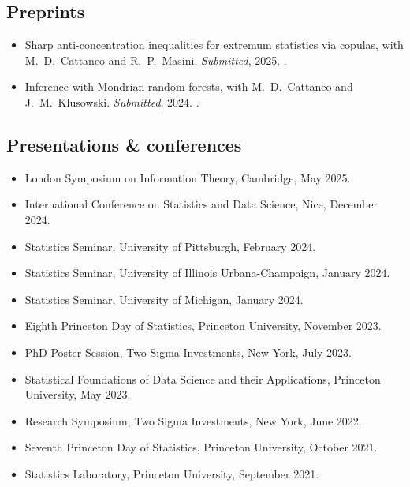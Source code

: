 \documentclass{wgu-cv}
\begin{document}
\subsection{Preprints}{}
\begin{itemize}

  \item Sharp anti-concentration inequalities
    for extremum statistics via copulas,
    with M.\ D.\ Cattaneo and R.\ P.\ Masini.
    \emph{Submitted}, 2025.
    .

  \item Inference with Mondrian random forests,
    with M.\ D.\ Cattaneo and J.\ M.\ Klusowski.
    \emph{Submitted}, 2024.
    .

\end{itemize}




\subsection{Presentations \& conferences}{}
\begin{itemize}
  \item London Symposium on Information Theory, Cambridge,
    May 2025.
  \item International Conference on Statistics and Data Science, Nice,
    December 2024.
  \item Statistics Seminar, University of Pittsburgh,
    February 2024.
  \item Statistics Seminar, University of Illinois Urbana-Champaign,
    January 2024.
  \item Statistics Seminar, University of Michigan,
    January 2024.
  \item Eighth Princeton Day of Statistics, Princeton University,
    November 2023.
  \item PhD Poster Session, Two Sigma Investments, New York,
    July 2023.
  \item Statistical Foundations of Data Science and their Applications,
    Princeton University,
    May 2023.
  \item Research Symposium, Two Sigma Investments, New York,
    June 2022.
  \item Seventh Princeton Day of Statistics, Princeton University,
    October 2021.
  \item Statistics Laboratory, Princeton University,
    September 2021.
\end{itemize}
\end{document}
